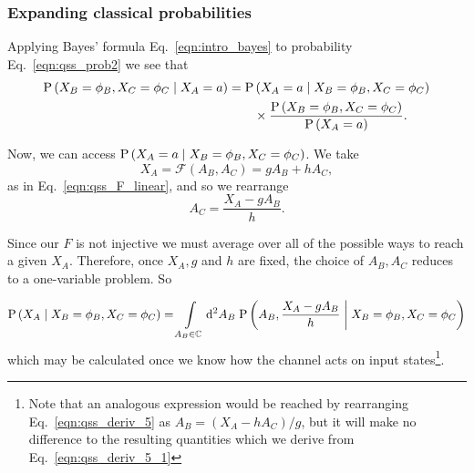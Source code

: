 




\subsubsection{Expanding classical probabilities}

Applying Bayes' formula Eq.~\ref{eqn:intro_bayes} to probability Eq.~\ref{eqn:qss_prob2} we see that
\begin{align}
\text{P}\left(X_B=\phi_B, X_C=\phi_C \; \middle| \; X_A=a\right) = \text{P}&\left(X_A=a \; \middle| \; X_B=\phi_B, X_C=\phi_C\right) \notag \\
&\times \frac{\text{P}\left(X_B=\phi_B, X_C=\phi_C\right)}{\text{P}\left(X_A=a\right)}.
\end{align}


\noindent Now, we can access $\text{P}\left(X_A=a \; \middle| \; X_B=\phi_B, X_C=\phi_C\right)$. 
We take
\begin{equation}\label{eqn:qss_deriv_5}
X_A = \mathcal{F}\left(A_B, A_C\right) = g A_B + h A_C,
\end{equation}
as in Eq.~\ref{eqn:qss_F_linear}, and so we rearrange
\begin{equation}
A_C = \frac{X_A - g A_B}{h}.
\end{equation}

\noindent Since our $F$ is not injective %
we must average over all of the possible ways to reach a given $X_A$. Therefore, once $X_A, g$ and $h$ are fixed, the choice of $A_B, A_C$ reduces to a one-variable problem. So

\begin{equation}\label{eqn:qss_deriv_5_1}
\text{P}\left(X_A \; \middle| \; X_B=\phi_B, X_C=\phi_C\right) = \int\limits_{A_B \in \mathbb{C}} \mathop{}\!\mathrm{d^2} A_B \; \text{P}\left(A_B , \frac{X_A - g A_B}{h} \; \middle| \; X_B=\phi_B, X_C=\phi_C\right)
\end{equation}
which may be calculated once we know how the channel acts on input states\footnote{Note that an analogous expression would be reached by rearranging Eq.~\ref{eqn:qss_deriv_5} as $A_B = \left(X_A - h A_C\right)/g$, but it will make no difference to the resulting quantities which we derive from Eq.~\ref{eqn:qss_deriv_5_1}}.

